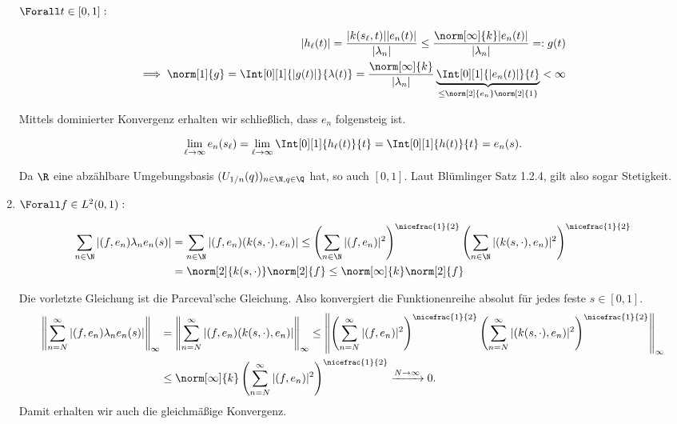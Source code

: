 \begin{solution}
\begin{enumerate}[label = (\alph*)]
  $\Forall t \in [0, 1]:$

  \begin{align*}
    |h_\ell(t)|
    =
    \frac
    {
      |k(s_\ell, t)|
      |e_n(t)|
    }
    {|\lambda_n|}
    \leq
    \frac
    {
      \norm[\infty]{k}
      |e_n(t)|
    }
    {|\lambda_n|}
    =:
    g(t) \\
    \implies
    \norm[1]{g}
    =
    \Int[0][1]
    {|g(t)|}{\lambda(t)}
    =
    \frac
    {\norm[\infty]{k}}
    {|\lambda_n|}
    \underbrace
    {
      \Int[0][1]
      {|e_n(t)|}{t}
    }_{
      \leq
      \norm[2]{e_n}
      \norm[2]{1}
    }
    < \infty
  \end{align*}

  Mittels dominierter Konvergenz
  erhalten wir schließlich, dass $e_n$ folgensteig ist.

  \begin{align*}
    \lim_{\ell \to \infty}
    e_n(s_\ell)
    =
    \lim_{\ell \to \infty}
    \Int[0][1]{h_\ell(t)}{t}
    =
    \Int[0][1]{h(t)}{t}
    =
    e_n(s).
  \end{align*}


  Da $\R$ eine abzählbare Umgebungsbasis $(U_{1/n}(q))_{n \in \N, q \in \Q}$ hat, so auch $[0, 1]$.
  Laut Blümlinger Satz 1.2.4, gilt also sogar Stetigkeit.

  \item
  $\Forall f \in L^2(0, 1):$

  \begin{align*}
    \sum_{n \in \N}
    |(f, e_n)\lambda_n e_n(s)|
     &= \sum_{n \in \N}
     |(f, e_n)(k(s,\cdot),e_n)| \leq
     \left(\sum_{n \in \N}
     |(f, e_n)|^2\right)^{\nicefrac{1}{2}}
     \left(\sum_{n \in \N}|(k(s,\cdot),e_n)|^2\right)^{\nicefrac{1}{2}} \\
    &= \norm[2]{k(s,\cdot)}\norm[2]{f} \leq\norm[\infty]{k}\norm[2]{f}
  \end{align*}

  Die vorletzte Gleichung ist die Parceval'sche Gleichung.
  Also konvergiert die Funktionenreihe absolut für jedes feste $s \in [0,1]$.
  \begin{align*}
    \left\|\sum_{n = N}^{\infty}
    |(f, e_n)\lambda_n e_n(s)|\right\|_{\infty}
     &= \left\|\sum_{n = N}^{\infty}
     |(f, e_n)(k(s,\cdot),e_n)|\right\|_{\infty} \leq
     \left\|\left(\sum_{n = N}^\infty
     |(f, e_n)|^2\right)^{\nicefrac{1}{2}}
     \left(\sum_{n = N}^\infty |(k(s,\cdot),e_n)|^2\right)^{\nicefrac{1}{2}}\right\|_{\infty} \\
    &\leq \norm[\infty]{k}\left(\sum_{n = N}^\infty |(f, e_n)|^2\right)^{\nicefrac{1}{2}}
    \xrightarrow{N \to \infty} 0.
  \end{align*}
  Damit erhalten wir auch die gleichmäßige Konvergenz.

\end{enumerate}

\end{solution}
